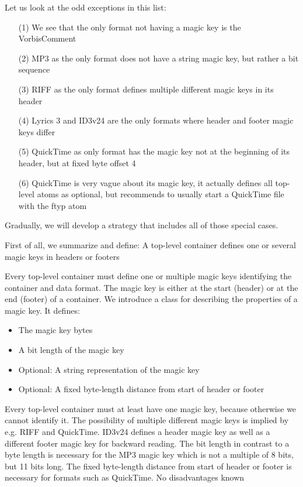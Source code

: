 Let us look at the odd exceptions in this list:
\begin{enumerate}
\item [(1)] We see that the only format not having a magic key is the VorbisComment
\item [(2)] MP3 as the only format does not have a string magic key, but rather a bit sequence
\item [(3)] RIFF as the only format defines multiple different magic keys in its header
\item [(4)] Lyrics 3 and ID3v24 are the only formats where header and footer magic keys differ
\item [(5)] QuickTime as only format has the magic key not at the beginning of its header, but at fixed byte offset 4
\item [(6)] QuickTime is very vague about its magic key, it actually defines all top-level atoms as optional, but recommends to usually start a QuickTime file with the ftyp atom
\end{enumerate}

Gradually, we will develop a strategy that includes all of those special cases.

First of all, we summarize and define:
{%
A top-level container defines one or several magic keys in headers or footers 
}
{%
Every top-level container must define one or multiple magic keys identifying the container and data format. The magic key is either at the start (header) or at the end (footer) of a container. We introduce a class for describing the properties of a magic key. It defines:
\begin{itemize}
\item The magic key bytes
\item A bit length of the magic key
\item Optional: A string representation of the magic key
\item Optional: A fixed byte-length distance from start of header or footer
\end{itemize}
}
{%
Every top-level container must at least have one magic key, because otherwise we cannot identify it. The possibility of multiple different magic keys is implied by e.g. RIFF and QuickTime. ID3v24 defines a header magic key as well as a different footer magic key for backward reading. The bit length in contrast to a byte length is necessary for the MP3 magic key which is not a multiple of 8 bits, but 11 bits long. The fixed byte-length distance from start of header or footer is necessary for formats such as QuickTime. 
}
{%
No disadvantages known
}

